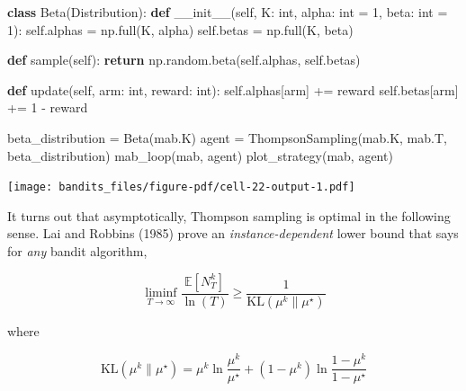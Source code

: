\documentclass[
  letterpaper,
  DIV=11,
  numbers=noendperiod]{scrreprt}
\newenvironment{Shaded}{\begin{snugshade}}{\end{snugshade}}
\newcommand{\BuiltInTok}[1]{\textcolor[rgb]{0.00,0.23,0.31}{#1}}
\newcommand{\ControlFlowTok}[1]{\textcolor[rgb]{0.00,0.23,0.31}{\textbf{#1}}}
\newcommand{\DecValTok}[1]{\textcolor[rgb]{0.68,0.00,0.00}{#1}}
\newcommand{\FunctionTok}[1]{\textcolor[rgb]{0.28,0.35,0.67}{#1}}
\newcommand{\KeywordTok}[1]{\textcolor[rgb]{0.00,0.23,0.31}{\textbf{#1}}}
\newcommand{\NormalTok}[1]{\textcolor[rgb]{0.00,0.23,0.31}{#1}}
\newcommand{\OperatorTok}[1]{\textcolor[rgb]{0.37,0.37,0.37}{#1}}
\newcommand{\VariableTok}[1]{\textcolor[rgb]{0.07,0.07,0.07}{#1}}
\theoremstyle{plain}
\theoremstyle{plain}
\theoremstyle{definition}
\theoremstyle{definition}
\theoremstyle{remark}
\begin{document}
\begin{Shaded}
\begin{Highlighting}[]
\KeywordTok{class}\NormalTok{ Beta(Distribution):}
    \KeywordTok{def} \FunctionTok{\_\_init\_\_}\NormalTok{(}\VariableTok{self}\NormalTok{, K: }\BuiltInTok{int}\NormalTok{, alpha: }\BuiltInTok{int} \OperatorTok{=} \DecValTok{1}\NormalTok{, beta: }\BuiltInTok{int} \OperatorTok{=} \DecValTok{1}\NormalTok{):}
        \VariableTok{self}\NormalTok{.alphas }\OperatorTok{=}\NormalTok{ np.full(K, alpha)}
        \VariableTok{self}\NormalTok{.betas }\OperatorTok{=}\NormalTok{ np.full(K, beta)}

    \KeywordTok{def}\NormalTok{ sample(}\VariableTok{self}\NormalTok{):}
        \ControlFlowTok{return}\NormalTok{ np.random.beta(}\VariableTok{self}\NormalTok{.alphas, }\VariableTok{self}\NormalTok{.betas)}

    \KeywordTok{def}\NormalTok{ update(}\VariableTok{self}\NormalTok{, arm: }\BuiltInTok{int}\NormalTok{, reward: }\BuiltInTok{int}\NormalTok{):}
        \VariableTok{self}\NormalTok{.alphas[arm] }\OperatorTok{+=}\NormalTok{ reward}
        \VariableTok{self}\NormalTok{.betas[arm] }\OperatorTok{+=} \DecValTok{1} \OperatorTok{{-}}\NormalTok{ reward}
\end{Highlighting}
\end{Shaded}

\begin{Shaded}
\begin{Highlighting}[]
\NormalTok{beta\_distribution }\OperatorTok{=}\NormalTok{ Beta(mab.K)}
\NormalTok{agent }\OperatorTok{=}\NormalTok{ ThompsonSampling(mab.K, mab.T, beta\_distribution)}
\NormalTok{mab\_loop(mab, agent)}
\NormalTok{plot\_strategy(mab, agent)}
\end{Highlighting}
\end{Shaded}

\texttt{[image: bandits\_files/figure-pdf/cell-22-output-1.pdf]}

It turns out that asymptotically, Thompson sampling is optimal in the
following sense. Lai and Robbins (1985) prove an
\emph{instance-dependent} lower bound that says for \emph{any} bandit
algorithm,

\[\liminf_{T \to \infty} \frac{\mathbb{E}[N_T^k]}{\ln(T)} \ge \frac{1}{\text{KL}(\mu^k \parallel \mu^\star)}\]

where

\[\text{KL}(\mu^k \parallel \mu^\star) = \mu^k \ln \frac{\mu^k}{\mu^\star} + (1 - \mu^k) \ln \frac{1 - \mu^k}{1 - \mu^\star}\]
\end{document}
